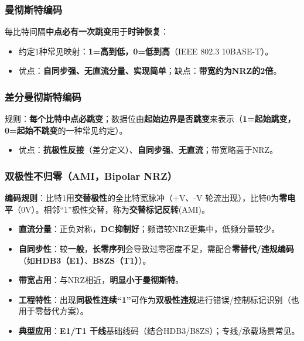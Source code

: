 \documentclass[lang=cn,newtx,10pt,scheme=chinese]{../../elegantbook}
\begin{document}
\subsubsection{曼彻斯特编码}
每比特间隔\textbf{中点必有一次跳变}用于\textbf{时钟恢复}：
\begin{itemize}
    \item 约定1种常见映射：\textbf{1=高到低，0=低到高}（IEEE 802.3 10BASE-T）。
    \item 优点：\textbf{自同步强、无直流分量、实现简单}；缺点：\textbf{带宽约为NRZ的2倍}。
\end{itemize}
\subsubsection{差分曼彻斯特编码}
规则：\textbf{每个比特中点必跳变}；数据位由\textbf{起始边界是否跳变}来表示（\textbf{1=起始跳变，0=起始不跳变}的一种常见约定）。
\begin{itemize}
    \item 优点：\textbf{抗极性反接}（差分定义）、\textbf{自同步强}、\textbf{无直流}；带宽略高于NRZ。
\end{itemize}

\subsubsection{双极性不归零（AMI，Bipolar NRZ）}
\textbf{编码规则}：比特1用\textbf{交替极性}的全比特宽脉冲（+V、-V 轮流出现），比特0为\textbf{零电平}（0V）。相邻“1”极性交替，称为\textbf{交替标记反转}(AMI)。
\begin{itemize}
    \item \textbf{直流分量}：正负对称，\textbf{DC抑制好}；频谱较NRZ更集中，低频分量较少。
    \item \textbf{自同步性}：较\textbf{一般}，\textbf{长零序列}会导致过零密度不足，需配合\textbf{零替代/违规编码}（如\textbf{HDB3（E1）}、\textbf{B8ZS（T1）}）。
    \item \textbf{带宽占用}：与NRZ相近，\textbf{明显小于曼彻斯特}。
    \item \textbf{工程特性}：出现\textbf{同极性连续“1”}可作为\textbf{双极性违规}进行错误/控制标记识别（也用于零替代方案）。
    \item \textbf{典型应用}：\textbf{E1/T1 干线}基础线码（结合HDB3/B8ZS）；专线/承载场景常见。
\end{itemize}
\end{document}
